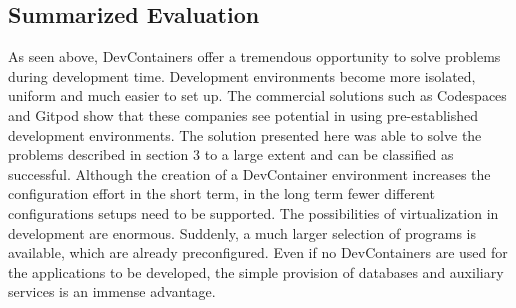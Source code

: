     \subsection{Summarized Evaluation}
    As seen above, DevContainers offer a tremendous opportunity to solve problems during development time. Development environments become more isolated, uniform and much easier to set up. The commercial solutions such as Codespaces and Gitpod show that these companies see potential in using pre-established development environments. \newline
    The solution presented here was able to solve the problems described in section 3 to a large extent and can be classified as successful. Although the creation of a DevContainer environment increases the configuration effort in the short term, in the long term fewer different configurations setups need to be supported. \newline
    The possibilities of virtualization in development are enormous. Suddenly, a much larger selection of programs is available, which are already preconfigured. Even if no DevContainers are used for the applications to be developed, the simple provision of databases and auxiliary services is an immense advantage.
